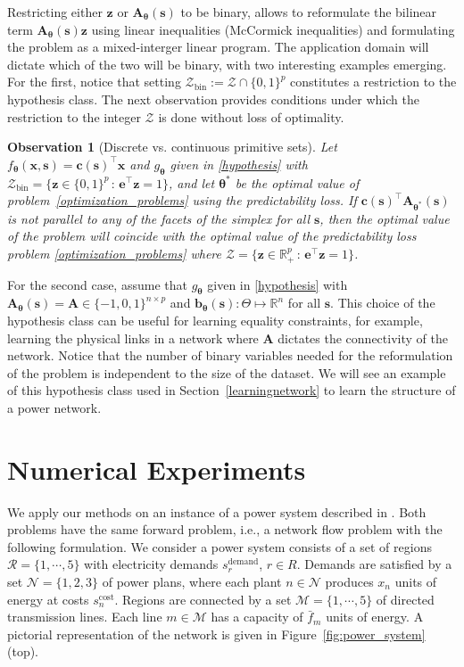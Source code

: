 \documentclass{article}
\theoremstyle{plain}
\newtheorem{observation}[theorem]{Observation}
\begin{document}
Restricting either $\bm z$ or $\bm A_{\bm\theta}(\bm s)$ to be binary, allows to reformulate the bilinear term $\bm A_{\bm\theta}(\bm s)\bm z$ using linear inequalities (McCormick inequalities) and formulating the problem as a mixed-interger linear program. The application domain will dictate which of the two will be binary, with two interesting examples emerging. For the first, notice that setting $\mathcal{Z}_{\text{bin}}:=\mathcal Z\cap\{0,1\}^p$ constitutes a restriction to the hypothesis class.   The next observation provides conditions under which the restriction to the integer $\mathcal{Z}$ is done without loss of optimality.
\begin{observation}[Discrete vs. continuous primitive sets]
Let $f_{\bm\theta}(\bm x, \bm s) = \bm c(\bm s)^\top \bm x$ and $g_{\bm\theta}$ given in \eqref{hypothesis} with $\mathcal{Z}_{\text{bin}} = \{\bm z\in\{0,1\}^p\,:\,\bm e^\top \bm z = 1\}$, and let $\bm\theta^*$ be the optimal value of problem~\eqref{optimization_problems} using the predictability loss. If $\bm c(\bm s)^\top\bm A_{\bm\theta^*}(\bm s)$ is not parallel to any of the facets of the simplex for all $\bm s$, then the optimal value of the problem will coincide with the optimal value of the predictability loss problem \eqref{optimization_problems} where $\mathcal{Z} = \{\bm z\in \mathbb R_+^p\,:\,\bm e^\top \bm z = 1\}$.
\end{observation}
For the second case, assume that $g_{\bm\theta}$ given in \eqref{hypothesis} with  $\bm A_{\bm \theta}(\bm s)=\bm{A}\in\{-1,0,1\}^{n\times p}$ and $\bm b_{\bm \theta}(\bm s):\Theta\mapsto\mathbb{R}^{n}$ for all $\bm s$. This choice of the hypothesis class can be useful for learning equality constraints, for example, learning the physical links in a network where $\bm{A}$ dictates the connectivity of the network.  Notice that the number of binary variables needed for the reformulation of the problem is independent to the size of the dataset. We will see an example of this hypothesis class used in Section~\ref{learningnetwork} to learn the structure of a power network.  
 


\section{Numerical Experiments}\label{sec:real}

We apply our methods on an instance of a power system described in \cite{bampou2011scenario}. Both problems have the same forward problem, i.e., a network flow problem with the following formulation. We consider a power system consists of a set of regions $ \mathcal R = \{1, \cdots , 5\}$ with electricity demands $s^{\text{demand}}_r$, $r \in R$. Demands are satisfied by a set $\mathcal N = \{1, 2, 3\}$ of power plans, where each plant $n \in \mathcal N$ produces $x_n$ units of energy at costs $s^{\text{cost}}_n$. Regions are connected by a set $\mathcal M = \{1, \cdots , 5\}$ of directed transmission lines. Each line $m\in \mathcal M$ has a capacity of $\bar{f}_m$ units of energy.  A pictorial representation of the network is given in Figure~\ref{fig:power_system} (top).
 
\end{document}
